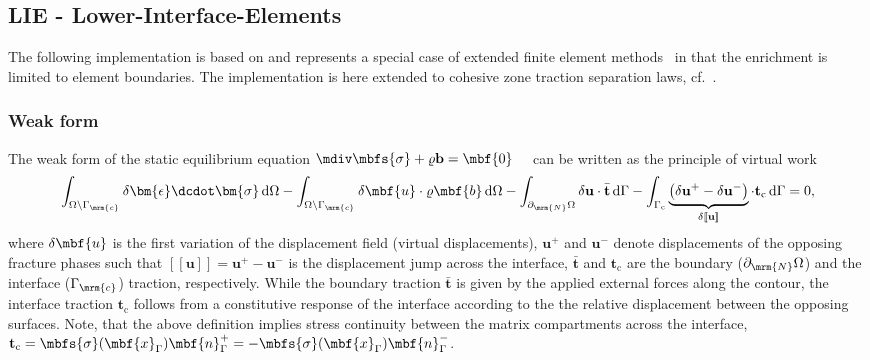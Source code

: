 \subsection{LIE - Lower-Interface-Elements}
The following implementation is based on \cite{Watanabe2012} and represents a special case of extended finite element methods~\cite{Moees1999,Belytschko2009,belytschko2001arbitrary} in that the enrichment is limited to element boundaries. 
The implementation is here extended to cohesive zone traction separation laws, cf.~\cite{needleman1990analysisa,needleman1990analysisb,nguyen2001cohesive,Elices2002,Gasser2005,Meschke2007}.

\subsubsection*{Weak form}
The weak form of the static equilibrium equation $\mdiv \mbfs{\sigma} + \varrho \mathbf{b} = \mbf{0} \quad $ can be written as the principle of virtual work
\begin{equation}
	\int_{\Omega \setminus \Gamma_\mrm{c}} \delta \bm{\epsilon} \dcdot \bm{\sigma} \, \mathrm{d} \Omega - \int_{\Omega \setminus \Gamma_\mrm{c}} \delta \mbf{u} \cdot \varrho \mbf{b} \, \mathrm{d} \Omega - \int_{\partial_\mrm{N}\Omega} \delta \mathbf{u} \cdot \bar{\mathbf{t}}\, \mathrm{d} \Gamma - \int_{\Gamma_{\mathrm{c}}} \underbrace{\left(\delta \mathbf{u^{+}} - \delta \mathbf{u^{-}}\right)}_{\delta [\![\mathbf{u}]\!]} \cdot \mathbf{t}_{\mathrm{c}} \, \mathrm{d} \Gamma = 0,
\label{eq:weak_form_equil_eq}
\end{equation}
where $\delta \mbf{u}$ is the first variation of the displacement field (virtual displacements), $\mathbf{u^{+}}$ and $\mathbf{u^{-}}$ denote displacements of the opposing fracture phases such that $[\![\mathbf{u}]\!] = \mathbf{u^{+}} - \mathbf{u^{-}}$ is the displacement jump across the interface, $\bar{\mathbf{t}}$ and $\mathbf{t}_{\mathrm{c}}$ are the boundary ($\partial_{\mrm{N}}\Omega$) and the interface ($\Gamma_\mrm{c}$) traction, respectively. While the boundary traction $\bar{\mathbf{t}}$ is given by the applied external forces along the contour, the interface traction $\mathbf{t}_{\mathrm{c}}$ follows from a constitutive response of the interface according to the the relative displacement between the opposing surfaces. Note, that the above definition implies stress continuity between the matrix compartments across the interface, $\mathbf{t}_{\mathrm{c}} = \mbfs{\sigma}(\mbf{x}_\Gamma) \mbf{n}^+_\Gamma = - \mbfs{\sigma}(\mbf{x}_\Gamma) \mbf{n}^-_\Gamma$.

